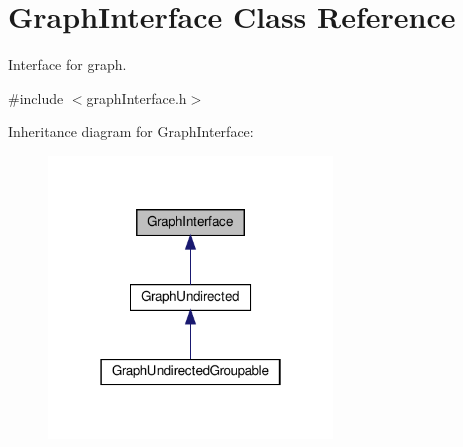 \hypertarget{classGraphInterface}{}\section{Graph\+Interface Class Reference}
\label{classGraphInterface}


Interface for graph.  




{\ttfamily \#include $<$graph\+Interface.\+h$>$}



Inheritance diagram for Graph\+Interface\+:
\nopagebreak
\begin{figure}[H]
\begin{center}
\leavevmode
\includegraphics[width=214pt]{classGraphInterface__inherit__graph}
\end{center}
\end{figure}
